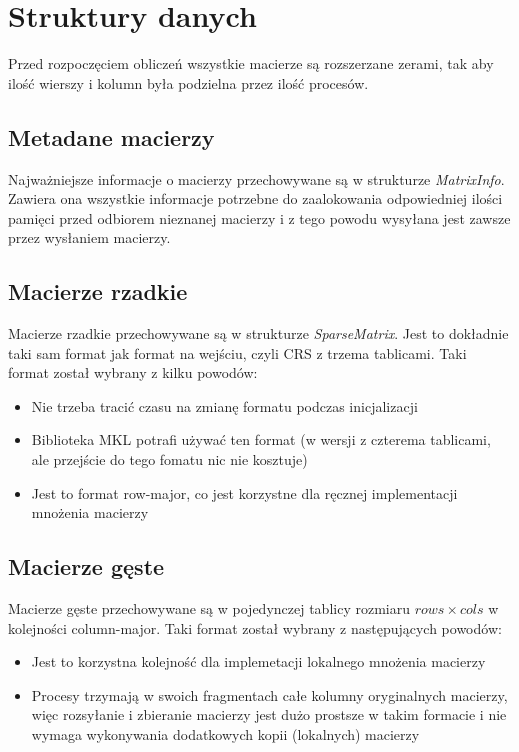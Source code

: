 \documentclass{article}
\begin{document}
\section{Struktury danych}

Przed rozpoczęciem obliczeń wszystkie macierze są rozszerzane zerami, tak aby ilość wierszy i kolumn była podzielna przez ilość procesów.

\subsection{Metadane macierzy}
Najważniejsze informacje o macierzy przechowywane są w strukturze \emph{MatrixInfo}. Zawiera ona wszystkie informacje potrzebne 
do zaalokowania odpowiedniej ilości pamięci przed odbiorem nieznanej macierzy i z tego powodu wysyłana jest zawsze przez wysłaniem 
macierzy.

\subsection{Macierze rzadkie}
Macierze rzadkie przechowywane są w strukturze \emph{SparseMatrix}. Jest to dokładnie taki sam format jak format na wejściu, 
czyli CRS z trzema tablicami.
Taki format został wybrany z kilku powodów:
\begin{itemize}
  \item Nie trzeba tracić czasu na zmianę formatu podczas inicjalizacji
  \item Biblioteka MKL potrafi używać ten format (w wersji z czterema tablicami, ale przejście do tego fomatu nic nie kosztuje)
  \item Jest to format row-major, co jest korzystne dla ręcznej implementacji mnożenia macierzy
\end{itemize}

\subsection{Macierze gęste}
Macierze gęste przechowywane są w pojedynczej tablicy rozmiaru $rows \times cols$ w kolejności column-major.
Taki format został wybrany z następujących powodów:
\begin{itemize}
  \item Jest to korzystna kolejność dla implemetacji lokalnego mnożenia macierzy
  \item Procesy trzymają w swoich fragmentach całe kolumny oryginalnych macierzy, więc rozsyłanie i zbieranie macierzy jest dużo prostsze
           w takim formacie i nie wymaga wykonywania dodatkowych kopii (lokalnych) macierzy
\end{itemize} 
\end{document}
